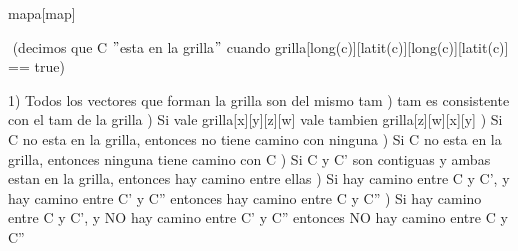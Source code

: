 \begin{Representacion}

\begin{Estructura}{mapa}[map]
	\begin{Tupla}[map]  
  	\end{Tupla}
  	
\end{Estructura}


$ $\newline
(decimos que C $"$esta en la grilla$"$ cuando grilla[long(c)][latit(c)][long(c)][latit(c)] == true) $ $\newline

1) Todos los vectores que forman la grilla son del mismo tam $ $) tam es consistente con el tam de la grilla $ $) Si vale grilla[x][y][z][w] vale tambien grilla[z][w][x][y] $ $) Si C no esta en la grilla, entonces no tiene camino con ninguna $ $) Si C no esta en la grilla, entonces ninguna tiene camino con C $ $) Si C y C' son contiguas y ambas estan en la grilla, entonces hay camino entre ellas $ $) Si hay camino entre C y C', y hay camino entre C' y C'' entonces hay camino entre C y C'' $ $) Si hay camino entre C y C', y NO hay camino entre C' y C'' entonces NO hay camino entre C y C'' $ $\newline



  

\AbsFc[]{}

\end{Representacion}

